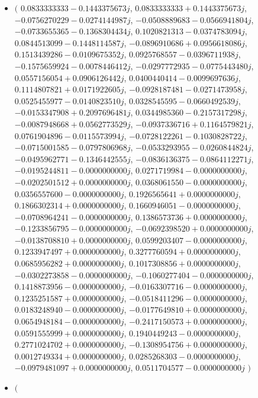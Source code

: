 \documentclass[14pt,a4paper]{article}
\begin{document}
\begin{itemize}
\item
$\big($
$0.0833333333-0.1443375673j$, $0.0833333333+0.1443375673j$, $-0.0756270229-0.0274144987j$, $-0.0508889683-0.0566941804j$, $-0.0733655365-0.1368304434j$, $0.1020821313-0.0374783094j$, $0.0844513099-0.1448114587j$, $-0.0896910686+0.0956618086j$, $0.1513439286-0.0109675352j$, $0.0925768557-0.0396711938j$, $-0.1575659924-0.0078446412j$, $-0.0297772935-0.0775443480j$, $0.0557156054+0.0906126442j$, $0.0400440414-0.0099697636j$, $0.1114807821+0.0171922605j$, $-0.0928187481-0.0271473958j$, $0.0525455977-0.0140823510j$, $0.0328545595-0.0660492539j$, $-0.0153347908+0.2097696481j$, $0.0344985360-0.2157317298j$, $-0.0087948668+0.0562773529j$, $-0.0937336716+0.1164579821j$, $0.0761904896-0.0115573994j$, $-0.0728122261-0.1030828722j$, $-0.0715001585-0.0797806968j$, $-0.0533293955-0.0260844824j$, $-0.0495962771-0.1346442555j$, $-0.0836136375-0.0864112271j$, $-0.0195244811-0.0000000000j$, $0.0271719984-0.0000000000j$, $-0.0202501512+0.0000000000j$, $0.0368061550-0.0000000000j$, $0.0356557600-0.0000000000j$, $0.1926565641+0.0000000000j$, $0.1866302314+0.0000000000j$, $0.1660946051-0.0000000000j$, $-0.0708964241-0.0000000000j$, $0.1386573736+0.0000000000j$, $-0.1233856795-0.0000000000j$, $-0.0692398520+0.0000000000j$, $-0.0138708810+0.0000000000j$, $0.0599203407-0.0000000000j$, $0.1233947497+0.0000000000j$, $0.3277760594+0.0000000000j$, $0.0685956282+0.0000000000j$, $0.1017308856+0.0000000000j$, $-0.0302273858-0.0000000000j$, $-0.1060277404-0.0000000000j$, $0.1418873956-0.0000000000j$, $-0.0163307716-0.0000000000j$, $0.1235251587+0.0000000000j$, $-0.0518411296-0.0000000000j$, $0.0183248940-0.0000000000j$, $-0.0177649810+0.0000000000j$, $0.0654948184-0.0000000000j$, $-0.2417150573+0.0000000000j$, $0.0591555999+0.0000000000j$, $0.1940449243-0.0000000000j$, $0.2771024702+0.0000000000j$, $-0.1308954756+0.0000000000j$, $0.0012749334+0.0000000000j$, $0.0285268303-0.0000000000j$, $-0.0979481097+0.0000000000j$, $0.0511704577-0.0000000000j$
$\big)$
\item
$\big($

\end{itemize}
\end{document}
